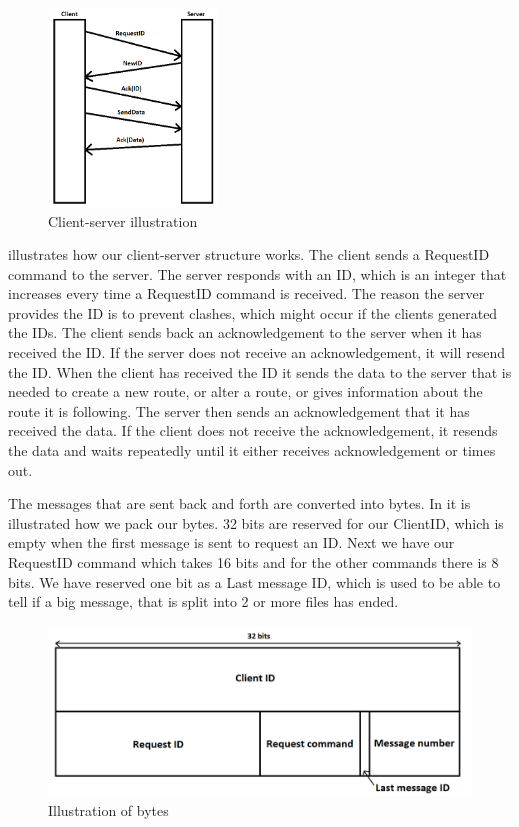 \begin{figure}[h!]
  \centering
    \includegraphics[width=0.4\textwidth]{figures/clientserver.png}
    \caption{Client-server illustration}
    \label{fig:clientserver}
\end{figure}

 illustrates how our client-server structure works. The client sends a RequestID command to the server. The server responds with an ID, which is an integer that increases every time a RequestID command is received. The reason the server provides the ID is to prevent clashes, which might occur if the clients generated the IDs. The client sends back an acknowledgement to the server when it has received the ID. If the server does not receive an acknowledgement, it will resend the ID. When the client has received the ID it sends the data to the server that is needed to create a new route, or alter a route, or gives information about the route it is following. The server then sends an acknowledgement that it has received the data. If the client does not receive the acknowledgement, it resends the data and waits repeatedly until it either receives acknowledgement or times out.

The messages that are sent back and forth are converted into bytes. In
 it is illustrated how we pack our bytes. 32 bits are reserved for our ClientID, which is empty when the first message is sent to request an ID. Next we have our RequestID command which takes 16 bits and for the other commands there is 8 bits. We have reserved one bit as a Last message ID, which is used to be able to tell if a big message, that is split into 2 or more files has ended.

\begin{figure}[h!]
  \centering
    \includegraphics[width=1\textwidth]{figures/bytesclientserver.png}
    \caption{Illustration of bytes}
    \label{fig:bytesclientserver}
\end{figure}

